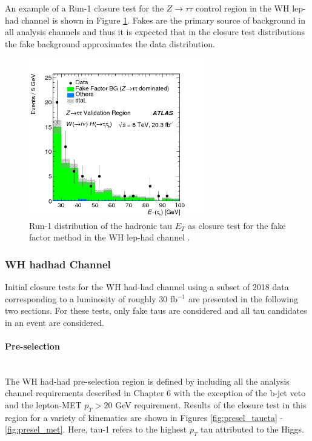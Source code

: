 An example of a Run-1 closure test for the $Z\rightarrow\tau\tau$ control region in the WH lep-had channel is shown in Figure \ref{fig:run1_ff_cr}. Fakes are the primary source of background in all analysis channels and thus it is expected that in the closure test distributions the fake background approximates the data distribution.\\  

\begin{figure}[htb!]
    \centering
    \includegraphics[width=3in]{figures/chapter7/run1_ff_cr.png}
    \caption{Run-1 distribution of the hadronic tau $E_T$ as closure test for the fake factor method in the WH lep-had channel \cite{vh_run1_paper}.}
    \label{fig:run1_ff_cr}
\end{figure}

\subsubsection{WH hadhad Channel}
Initial closure tests for the WH had-had channel using a subset of 2018 data corresponding to a luminosity of roughly 30 fb$^{-1}$ are presented in the following two sections. For these tests, only fake taus are considered and all tau candidates in an event are considered.

\paragraph{Pre-selection}\mbox{} \\
The WH had-had pre-selection region is defined by including all the analysis channel requirements described in Chapter 6 with the exception of the b-jet veto and the lepton-MET $p_T>20$ GeV requirement. Results of the closure test in this region for a variety of kinematics are shown in Figures \ref{fig:presel_taueta} - \ref{fig:presel_met}. Here, tau-1 refers to the highest $p_T$ tau attributed to the Higgs.

